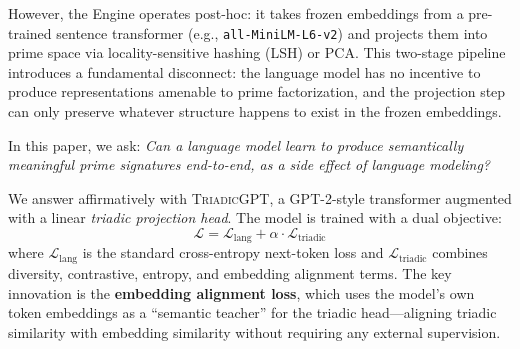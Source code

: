 \documentclass[11pt,a4paper]{article}
\newcommand{\microgpt}{\textsc{TriadicGPT}}
\newcommand{\loss}[1]{\mathcal{L}_{\text{#1}}}
\begin{document}
However, the Engine operates post-hoc: it takes frozen embeddings from a pre-trained sentence transformer (e.g., \texttt{all-MiniLM-L6-v2}) and projects them into prime space via locality-sensitive hashing (LSH) or PCA. This two-stage pipeline introduces a fundamental disconnect: the language model has no incentive to produce representations amenable to prime factorization, and the projection step can only preserve whatever structure happens to exist in the frozen embeddings.

In this paper, we ask: \emph{Can a language model learn to produce semantically meaningful prime signatures end-to-end, as a side effect of language modeling?}

We answer affirmatively with \microgpt{}, a GPT-2-style transformer augmented with a linear \emph{triadic projection head}. The model is trained with a dual objective:
\begin{equation}
    \mathcal{L} = \loss{lang} + \alpha \cdot \loss{triadic}
    \label{eq:total_loss}
\end{equation}
where $\loss{lang}$ is the standard cross-entropy next-token loss and $\loss{triadic}$ combines diversity, contrastive, entropy, and embedding alignment terms. The key innovation is the \textbf{embedding alignment loss}, which uses the model's own token embeddings as a ``semantic teacher'' for the triadic head---aligning triadic similarity with embedding similarity without requiring any external supervision.
\end{document}
